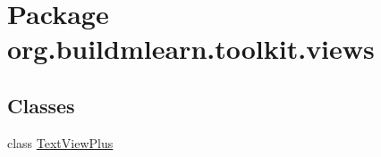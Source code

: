 \hypertarget{namespaceorg_1_1buildmlearn_1_1toolkit_1_1views}{\section{Package org.\-buildmlearn.\-toolkit.\-views}
\label{namespaceorg_1_1buildmlearn_1_1toolkit_1_1views}
}
\subsection*{Classes}
\begin{DoxyCompactItemize}
\item 
class \hyperlink{classorg_1_1buildmlearn_1_1toolkit_1_1views_1_1TextViewPlus}{Text\-View\-Plus}
\end{DoxyCompactItemize}
